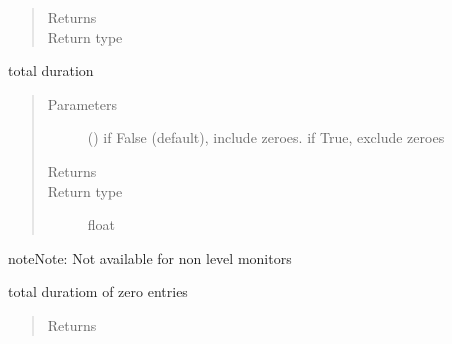\documentclass[letterpaper,10pt,english]{sphinxmanual}
\begin{document}
\begin{fulllineitems}
\begin{fulllineitems}
\begin{quote}
\begin{description}
\item[{Returns}] \leavevmode
{}

\item[{Return type}] \leavevmode
{\hyperref[\detokenize{Reference:salabim.Monitor}]{}}

\end{description}\end{quote}

\end{fulllineitems}


\begin{fulllineitems}
\label{\detokenize{Reference:salabim.Monitor.duration}}
total duration
\begin{quote}\begin{description}
\item[{Parameters}] \leavevmode
{} () \textendash{} if False (default), include zeroes. if True, exclude zeroes

\item[{Returns}] \leavevmode
{}

\item[{Return type}] \leavevmode
float

\end{description}\end{quote}

\begin{sphinxadmonition}{note}{Note:}
Not available for non level monitors
\end{sphinxadmonition}

\end{fulllineitems}


\begin{fulllineitems}
\label{\detokenize{Reference:salabim.Monitor.duration_zero}}
total duratiom of zero entries
\begin{quote}\begin{description}
\item[{Returns}] \leavevmode
{}


\end{description}
\end{quote}
\end{fulllineitems}
\end{fulllineitems}
\end{document}
